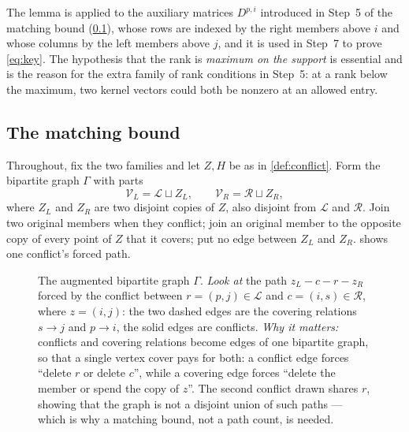 \begin{remark}\label{rem:kernel-use}
The lemma is applied to the auxiliary matrices $D^{p,i}$ introduced in Step~5 of the matching
bound (\cref{sec:matching}), whose rows are indexed by the right members above $i$ and whose columns
by the left members above $j$, and it is used in Step~7 to prove \eqref{eq:key}. The hypothesis that
the rank is \emph{maximum on the support} is essential and is the reason for the extra family of rank
conditions in Step~5: at a rank below the maximum, two kernel vectors could both be nonzero at an
allowed entry.
\end{remark}


\subsection{The matching bound}\label{sec:matching}

Throughout, fix the two families and let $Z,H$ be as in \cref{def:conflict}. Form the
bipartite graph $\Gamma$ with parts
\begin{equation}\label{eq:Gamma}
 \mathcal V_L=\mathcal L\sqcup Z_L,\qquad \mathcal V_R=\mathcal R\sqcup Z_R,
\end{equation}
where $Z_L$ and $Z_R$ are two disjoint copies of $Z$, also disjoint from $\mathcal L$ and
$\mathcal R$. Join two original members when they conflict; join an original member to the opposite
copy of every point of $Z$ that it covers; put no edge between $Z_L$ and $Z_R$.
 shows one conflict's forced path.

\begin{figure}[t]
\centering

\caption{The augmented bipartite graph $\Gamma$. \emph{Look at} the path
 $z_L-c-r-z_R$ forced by the conflict between $r=(p,j)\in\mathcal L$ and $c=(i,s)\in\mathcal R$,
 where $z=(i,j)$: the two dashed edges are the covering relations $s\to j$ and $p\to i$, the solid
 edges are conflicts. \emph{Why it matters:} conflicts and covering relations become edges of one
 bipartite graph, so that a single vertex cover pays for both: a conflict edge forces ``delete $r$ or
 delete $c$'', while a covering edge forces ``delete the member or spend the copy of $z$''. The
 second conflict drawn shares $r$, showing that the graph is not a disjoint union of such paths ---
 which is why a matching bound, not a path count, is needed.}
\label{fig:pruning-graph}
\end{figure}

